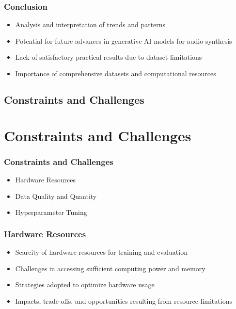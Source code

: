 \begin{frame}
    \frametitle{Conclusion}

    \begin{itemize}
        \item Analysis and interpretation of trends and patterns
        \item Potential for future advances in generative AI models for audio synthesis
        \item Lack of satisfactory practical results due to dataset limitations
        \item Importance of comprehensive datasets and computational resources
    \end{itemize}
    
\end{frame}

\subsection{Constraints and Challenges}

\section{Constraints and Challenges} \label{sec:res-limitations}

\begin{frame}
    \frametitle{Constraints and Challenges}
    
    \begin{itemize}
        \item Hardware Resources
        \item Data Quality and Quantity
        \item Hyperparameter Tuning
    \end{itemize}
    
\end{frame}

\begin{frame}
    \frametitle{Hardware Resources}

    \begin{itemize}
        \item Scarcity of hardware resources for training and evaluation
        \item Challenges in accessing sufficient computing power and memory
        \item Strategies adopted to optimize hardware usage
        \item Impacts, trade-offs, and opportunities resulting from resource limitations
    \end{itemize}
    
\end{frame}


